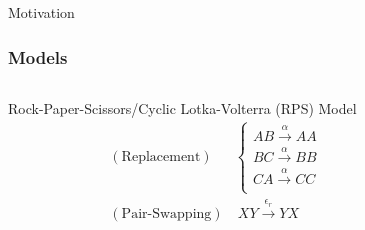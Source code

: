 \documentclass[aspectratio=169]{beamer}
\begin{document}
\begin{frame}[t]{Motivation}
\begin{figure}[h]
            \label{fig:name}
        \end{figure}
    \end{frame}
    \begin{frame}
        \frametitle{Models}

                
        \begin{columns}
            \begin{column}{0.5\textwidth}
                \centering
                    Rock-Paper-Scissors/Cyclic Lotka-Volterra (RPS) Model
                        \begin{align*}
                            (\text{Replacement})  &
                            \left\{
                            \begin{matrix}
                            AB \xrightarrow{\alpha} AA\\
                            BC \xrightarrow{\alpha} BB\\
                            CA \xrightarrow{\alpha} CC\\
                            \end{matrix}
                            \right.\\
                            (\text{Pair-Swapping}) & \ XY \xrightarrow{\epsilon_r} YX \\
                        \end{align*}
            \end{column}
            \begin{column}{0.5\textwidth}
                \centering

                \vspace{-16pt}


\end{column}
\end{columns}
\end{frame}
\end{document}
